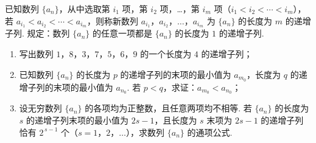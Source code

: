 \begin{problem}
已知数列 \(\{a_n\}\)，从中选取第 \(i_1\) 项，第 \(i_2\) 项，…，第 \(i_m\) 项（\(i_1<i_2<\cdots<i_m\)），若 \(a_{i_1}<a_{i_2}<\cdots<a_{i_m}\)，则称新数列 \(a_{i_1}\)，\(a_{i_2}\)，\(\dots\)，\(a_{i_m}\) 为 \(\{a_n\}\) 的长度为 \(m\) 的递增子列. 规定：数列 \(\{a_n\}\) 的任意一项都是 \(\{a_n\}\) 的长度为 \(1\) 的递增子列.

\begin{enumerate}
\item 写出数列 \(1\)，\(8\)，\(3\)，\(7\)，\(5\)，\(6\)，\(9\) 的一个长度为 \(4\) 的递增子列；

\item 已知数列 \(\{a_n\}\) 的长度为 \(p\) 的递增子列的末项的最小值为 \(a_{m_0}\)，长度为 \(q\) 的递增子列的末项的最小值为 \(a_{n_0}\). 若 \(p<q\)，求证：\(a_{m_0}<a_{n_0}\)；

\item 设无穷数列 \(\{a_n\}\) 的各项均为正整数，且任意两项均不相等. 若 \(\{a_n\}\) 的长度为 \(s\) 的递增子列末项的最小值为 \(2s-1\)，且长度为 \(s\) 末项为 \(2s-1\) 的递增子列恰有 \(2^{\,s-1}\) 个（\(s=1\)，\(2\)，\(\dots\)），求数列 \(\{a_n\}\) 的通项公式.
\end{enumerate}
\end{problem}

